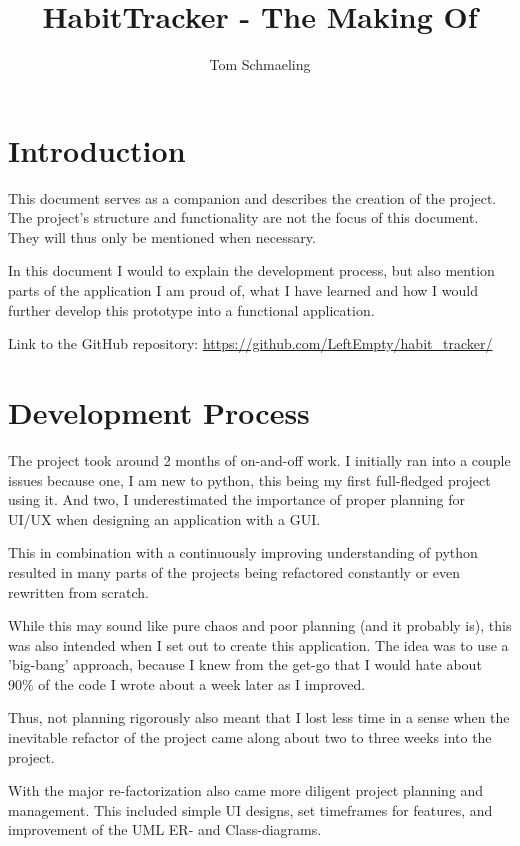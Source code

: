 \documentclass[11pt]{article}
\title{HabitTracker - The Making Of}
\author{Tom Schmaeling}
\date{}
\begin{document}
\maketitle


\section*{Introduction}

This document serves as a companion and describes the creation of the
project. The project's structure and functionality are not the focus
of this document. They will thus only be mentioned when necessary.

In this document I would to explain the development process,
but also mention parts of the application I am proud of, what I have
learned and how I would further develop this prototype into a functional
application.

Link to the GitHub repository: \href{https://github.com/LeftEmpty/habit_tracker/}
{https://github.com/LeftEmpty/habit\_tracker/}


\section*{Development Process}

The project took around 2 months of on-and-off work. I initially ran
into a couple issues because one, I am new to python, this being my first
full-fledged project using it. And two, I underestimated the importance of
proper planning for UI/UX when designing an application with a GUI.

This in combination with a continuously improving understanding of python
resulted in many parts of the projects being refactored constantly or even
rewritten from scratch.

While this may sound like pure chaos and poor planning (and it probably is),
this was also intended when I set out to create this application. The idea
was to use a 'big-bang' approach, because I knew from the get-go that I
would hate about 90\% of the code I wrote about a week later as I improved.

Thus, not planning rigorously also meant that I lost less time in a sense
when the inevitable refactor of the project came along about two to three
weeks into the project.

With the major re-factorization also came more diligent project planning
and management. This included simple UI designs, set timeframes for features,
and improvement of the UML ER- and Class-diagrams.
\end{document}
